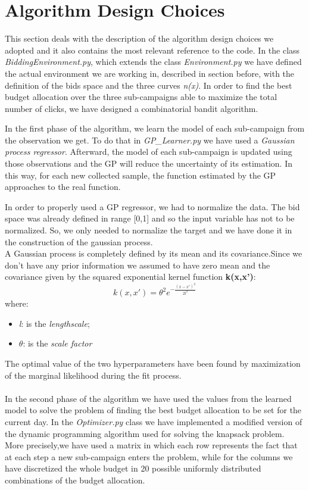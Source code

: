 \section{Algorithm Design Choices}

This section deals with the description of the algorithm design choices we adopted and
it also contains the most relevant reference to the code.
In the class \textit{BiddingEnvironment.py}, which extends the class \textit{Environment.py} we have defined the actual environment we are working in, described in section before, with the definition of the bids space and the three curves \textit{n(x)}.
In order to find the best budget allocation over the three sub-campaigns able to maximize the total number of clicks, we have designed a combinatorial bandit algorithm.

In the first phase of the algorithm, we learn the model of each sub-campaign from the observation we get.
To do that in \textit{GP\_Learner.py} we have used a \textit{Gaussian process regressor}.
Afterward, the model of each sub-campaign is updated using those observations and the GP will reduce the uncertainty of its estimation.
In this way, for each new collected sample, the function estimated by the GP approaches to the real function.


In order to properly used a GP regressor, we had to normalize the data. The bid space was already defined in range [0,1] and so the input variable has not to be normalized. So, we only needed to normalize the target and we have done it in the construction of the gaussian process.\\
A Gaussian process is completely defined by its mean and its covariance.Since we don't have any prior information we assumed to have zero mean and the covariance given by the squared exponential kernel function \textbf{k(x,x')}:
\begin{equation}
	k(x,x') = \theta^{2} e^{-\frac{(x-x')^2}{2 l^2}}
\end{equation}
where:
\begin{itemize}
	\item \textit{l}: is the \textit{lengthscale};
	\item $\theta$: is the \textit{scale factor}
\end{itemize}
The optimal value of the two hyperparameters have been found by maximization of the marginal likelihood during the fit process.
\\
\\
In the second phase of the algorithm we have used the values from the learned model to solve the problem of finding the best budget allocation to be set for the current day.
In the \textit{Optimizer.py} class we have implemented a modified version of the dynamic programming algorithm used for solving the knapsack problem.
More precisely,we have used a matrix in which each row represents the fact that at each step a new sub-campaign enters the problem, while for the columns we have discretized the whole budget in 20 possible uniformly distributed combinations of the budget allocation.

